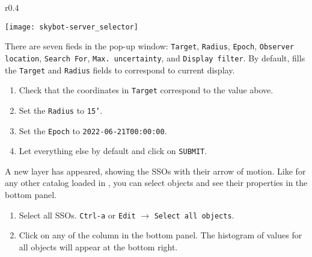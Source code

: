\begin{wrapfigure}[11]{r}{0.4\textwidth}
  \vspace{-2.5em}
  \begin{center}
    \texttt{[image: skybot-server\_selector]}
  \end{center}
\end{wrapfigure}

  There are seven fieds in the pop-up window:
  \texttt{Target},
  \texttt{Radius},
  \texttt{Epoch},
  \texttt{Observer location},
  \texttt{Search For},
  \texttt{Max. uncertainty}, and
  \texttt{Display filter}.
  By default, \aladin fills the
  \texttt{Target} and
  \texttt{Radius} fields to correspond to current display.

  \begin{enumerate}
    \setlength\itemsep{0em}
    \setcounter{enumi}{\value{saveitem}}
    \item Check that the coordinates in \texttt{Target} correspond to the value above.

    \item Set the \texttt{Radius} to \texttt{15'}.

    \item Set the \texttt{Epoch} to \texttt{2022-06-21T00:00:00}.

    \item Let everything else by default and click on \texttt{SUBMIT}.
  \end{enumerate}
  \setcounter{saveitem}{\value{enumi}}  

  A new layer has appeared, showing the SSOs with their
  arrow of motion. Like for any other catalog loaded in \aladin,
  you can select objects and see their properties in the bottom panel.

  \begin{enumerate}
    \setlength\itemsep{0em}
    \setcounter{enumi}{\value{saveitem}}
    \item Select all SSOs. \texttt{Ctrl-a} or \texttt{Edit} $\rightarrow$ \texttt{Select all objects}.

    \item Click on any of the column in the bottom panel. The histogram of values for all 
      objects will appear at the bottom right.
  \end{enumerate}
  \setcounter{saveitem}{\value{enumi}}  



